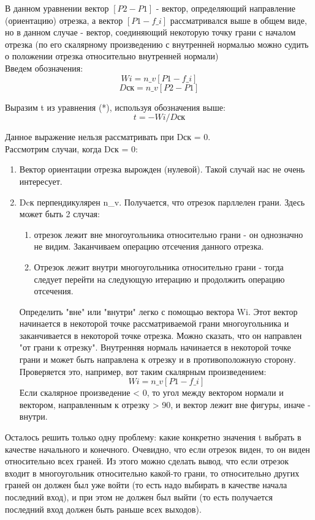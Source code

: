 \documentclass[a4paper,12pt]{article}
\begin{document}
	В данном уравнении вектор $[P2  - P1]$ - вектор, определяющий направление (ориентацию) отрезка, а вектор $[P1 - f\_i]$  рассматривался выше в общем виде, но в данном случае - вектор, соединяющий некоторую точку грани с началом отрезка (по его скалярному произведению с внутренней нормалью можно судить о положении отрезка относительно внутренней нормали)\\
	
	Введем обозначения:\\
	\[Wi = n\_v[P1 - f\_i]\]
	\[Dск = n\_v[P2  - P1]\]
	
	Выразим t из уравнения (*), используя обозначения выше:
	\[t = -Wi / Dск\]
	
	Данное выражение нельзя рассматривать при Dск = 0.\\

	Рассмотрим случаи, когда Dск = 0:
	
	\begin{enumerate} 
		\item Вектор ориентации отрезка вырожден (нулевой). Такой случай нас не очень интересует.
		\item Dcк перпендикулярен n\_v. Получается, что отрезок парллелен грани. Здесь может быть 2 случая: 
		\begin{enumerate} 
			\item отрезок лежит вне многоугольника относительно грани - он однозначно  не видим. Заканчиваем операцию отсечения данного отрезка. 
			\item  Отрезок лежит внутри многоугольника относительно грани - тогда следует перейти на следующую итерацию и продолжить операцию отсечения. 
		\end{enumerate}
	
		Определить "вне" или "внутри" легко с помощью вектора Wi. Этот вектор начинается в некоторой точке рассматриваемой грани многоугольника и заканчивается в некоторой точке отрезка. Можно сказать, что он направлен "от грани к отрезку". Внутренняя нормаль начинается в некоторой точке грани и может быть направлена к отрезку и в противоположную сторону. 
		Проверяется это, например, вот таким скалярным произведением: 
		\[Wi = n\_v[P1 - f\_i]\] 
		Если скалярное произведение < 0, то угол между вектором нормали и вектором, направленным к отрезку > 90, и вектор лежит вне фигуры, иначе - внутри. 
	
	\end{enumerate}

	
	Осталось решить только одну проблему: какие конкретно значения t выбрать в качестве начального и конечного. Очевидно, что если отрезок виден, то он виден относительно всех граней. Из этого можно сделать вывод, что если отрезок входит в многоугольник относительно какой-то грани, то относительно других граней он должен был уже войти (то есть надо выбирать в качестве начала последний вход), и при этом не должен был выйти (то есть получается последний вход должен быть раньше всех выходов).\\
	
\end{document}
